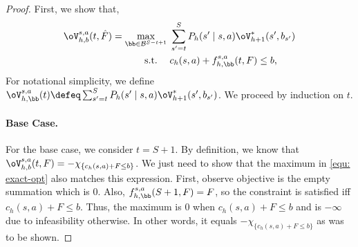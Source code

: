 \documentclass[pdftex, a4paper, 12pt]{article}
\newcommand{\mB}{\mathcal{B}}
\newcommand{\hF}{\hat{F}}
\begin{document}
\begin{proof}
    First, we show that,
    \begin{equation}\label{equ: exact-opt}
        \begin{split}
            \oV^{s,a}_{h,b}(t,\hF) = \max_{\bb \in \mB^{S-t+1}} & \; \sum_{s' = t}^S P_h(s' \mid s,a) \oV^*_{h+1}(s',b_{s'}) \\
            \text{s.t.} \quad  & \; c_h(s,a) + f_{h, \bb}^{s,a}(t, F) \leq b,
        \end{split}
    \end{equation}
    For notational simplicity, we define $\oV^{s,a}_{h,\bb}(t) \defeq \sum_{s' = t}^S P_h(s' \mid s,a) \oV^*_{h+1}(s', b_{s'})$.
    We proceed by induction on $t$. 

    \paragraph{Base Case.} For the base case, we consider $t = S+1$. By definition, we know that $\oV_{h,b}^{s,a}(t,F) = -\chi_{\{c_h(s,a) + F \leq b\}}$. We just need to show that the maximum in \eqref{equ: exact-opt} also matches this expression. First, observe objective is the empty summation which is $0$. Also, $f_{h, \bb}^{s,a}(S+1,F) = F$, so the constraint is satisfied iff $c_h(s,a) + F \leq b$. Thus, the maximum is $0$ when $c_h(s,a) + F \leq b$ and is $-\infty$ due to infeasibility otherwise. In other words, it equals $-\chi_{\{c_h(s,a) + F \leq b\}}$ as was to be shown.


\end{proof}
\end{document}
